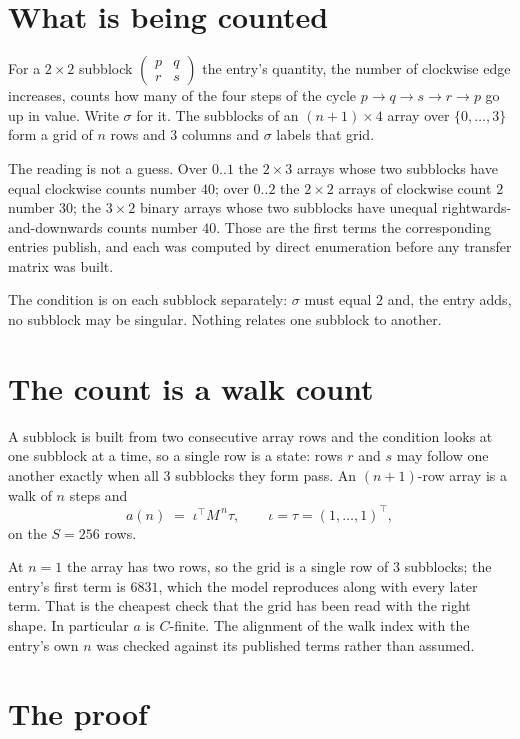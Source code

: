 \documentclass[11pt,a4paper]{article}
\theoremstyle{plain}
\theoremstyle{definition}
\begin{document}
\section{What is being counted}

For a $2\times2$ subblock $\begin{pmatrix}p&q\\r&s\end{pmatrix}$ the
entry's quantity, the number of clockwise edge increases, counts how many of the four steps of the cycle $p\to q\to s\to r\to p$ go up in value. Write $\sigma$ for it. The subblocks of an
$(n+1)\times4$ array over $\{0,\dots,3\}$ form a grid of $n$ rows and $3$
columns and $\sigma$ labels that grid.

The reading is not a guess. Over $0..1$ the $2\times3$ arrays whose two subblocks have equal
clockwise counts number $40$; over $0..2$ the $2\times2$ arrays of clockwise count $2$ number
$30$; the $3\times2$ binary arrays whose two subblocks have unequal rightwards-and-downwards
counts number $40$. Those are the first terms the corresponding entries publish, and each was
computed by direct enumeration before any transfer matrix was built.

The condition is on each subblock separately: $\sigma$ must equal $2$ and, the entry adds, no subblock may be singular. Nothing
relates one subblock to another.

\section{The count is a walk count}

A subblock is built from two consecutive array rows and the condition looks
at one subblock at a time, so a single row is a state: rows $r$ and $s$ may follow one another
exactly when all $3$ subblocks they form pass. An $(n+1)$-row array is a walk of $n$ steps and
\[
a(n)\;=\;\iota^{\!\top}M^{\,n}\tau,\qquad\iota=\tau=(1,\dots,1)^{\!\top},
\]
on the $S=256$ rows.

At $n=1$ the array has two rows, so the grid is a single row of $3$
subblocks; the entry's first term is $6831$, which the model
reproduces along with every later term. That is the cheapest check that the grid has been read
with the right shape.
In particular $a$ is $C$-finite. The alignment of the walk index with the entry's own $n$ was
checked against its published terms rather than assumed.

\section{The proof}
\end{document}
